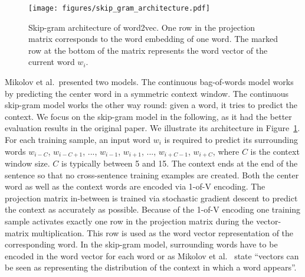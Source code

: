 \documentclass[
        a4paper,
        titlepage,
        twoside,
        parskip,
        numbers=noenddot
        ]{scrbook}
\theoremstyle{break}
\begin{document}
\begin{figure}
       \centering
       \texttt{[image: figures/skip\_gram\_architecture.pdf]}
       \caption{Skip-gram architecture of word2vec.
       One row in the projection matrix corresponds to the word embedding of one word.
       The marked row at the bottom of the matrix represents the word vector of the current word $w_i$.}
       \label{fig:skip_gram_architecture}
\end{figure}

Mikolov et al.\ presented two models.
The continuous bag-of-words model works by predicting the center word in a symmetric context window.
The continuous skip-gram model works the other way round: given a word, it tries to predict the context.
We focus on the skip-gram model in the following, as it had the better evaluation results in the original paper.
We illustrate its architecture in Figure~\ref{fig:skip_gram_architecture}.
For each training sample, an input word $w_i$ is required to predict its surrounding words $w_{i - C}$, $w_{i - C + 1}$, ..., $w_{i - 1}$, $w_{i + 1}$, ..., $w_{i + C - 1}$, $w_{i + C}$, where $C$ is the context window size.
$C$ is typically between 5 and 15.
The context ends at the end of the sentence so that no cross-sentence training examples are created.
Both the center word as well as the context words are encoded via 1-of-V encoding.
The projection matrix in-between is trained via stochastic gradient descent to predict the context as accurately as possible.
Because of the 1-of-V encoding one training sample activates exactly one row in the projection matrix during the vector-matrix multiplication.
This row is used as the word vector representation of the corresponding word.
In the skip-gram model, surrounding words have to be encoded in the word vector for each word or as Mikolov et al.~\cite{Mikolov2013} state ``vectors can be seen as representing the distribution of the context in which a word appears''.
\end{document}
